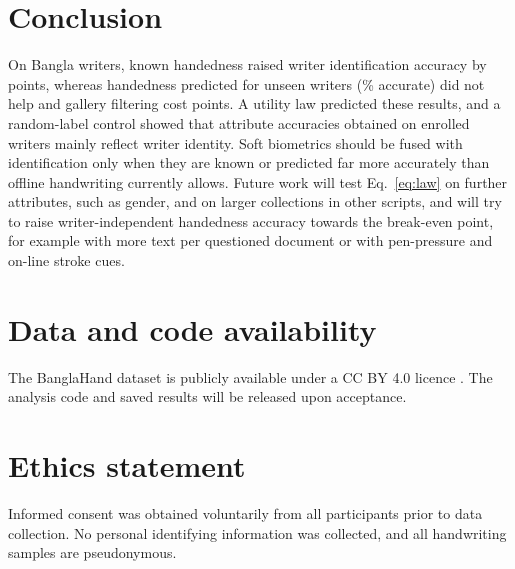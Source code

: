 \documentclass[conference,a4paper]{IEEEtran}
\begin{document}
\section{Conclusion}
On \vnWriters{} Bangla writers, known handedness raised writer identification accuracy by \vOracleGain{} points, whereas handedness predicted for unseen writers (\vHandOwn\% accurate) did not help and gallery filtering cost \vFilterLoss{} points. A utility law predicted these results, and a random-label control showed that attribute accuracies obtained on enrolled writers mainly reflect writer identity. Soft biometrics should be fused with identification only when they are known or predicted far more accurately than offline handwriting currently allows. Future work will test Eq.~\eqref{eq:law} on further attributes, such as gender, and on larger collections in other scripts, and will try to raise writer-independent handedness accuracy towards the break-even point, for example with more text per questioned document or with pen-pressure and on-line stroke cues.

\section*{Data and code availability}
The BanglaHand dataset is publicly available under a CC BY 4.0 licence \cite{banglahand2026dataset}. The analysis code and saved results will be released upon acceptance.

\section*{Ethics statement}
Informed consent was obtained voluntarily from all participants prior to data collection. No personal identifying information was collected, and all handwriting samples are pseudonymous.



\end{document}
